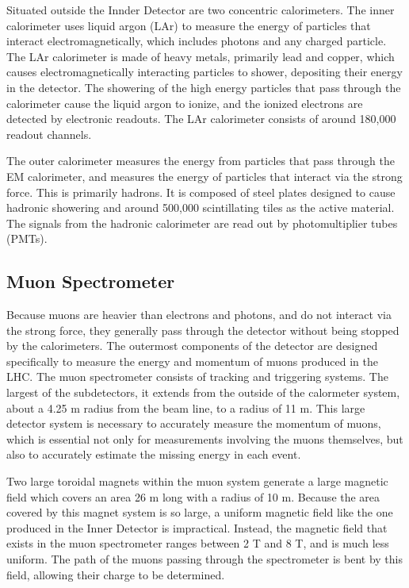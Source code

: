 Situated outside the Innder Detector are two concentric calorimeters. The inner calorimeter uses liquid argon (LAr) to measure the  energy of particles that interact electromagnetically, which includes photons and any charged particle. The LAr calorimeter is made of heavy metals, primarily lead and copper, which causes electromagnetically interacting particles to shower, depositing their energy in the detector. The showering of the high energy particles that pass through the calorimeter cause the liquid argon to ionize, and the ionized electrons are detected by electronic readouts. The LAr calorimeter consists of around 180,000 readout channels.  

The outer calorimeter measures the energy from particles that pass through the EM calorimeter, and measures the energy of particles that interact via the strong force. This is primarily hadrons. It is composed of steel plates designed to cause hadronic showering and around 500,000 scintillating tiles as the active material. The signals from the hadronic calorimeter are read out by photomultiplier tubes (PMTs).

\subsection{Muon Spectrometer}
\label{sec:muonSpec}

Because muons are heavier than electrons and photons, and do not interact via the strong force, they generally pass through the detector without being stopped by the calorimeters. The outermost components of the detector are designed specifically to measure the energy and momentum of muons produced in the LHC. The muon spectrometer consists of tracking and triggering systems. The largest of the subdetectors, it extends from the outside of the calormeter system, about a 4.25 m radius from the beam line, to a radius of 11 m. This large detector system is necessary to accurately measure the momentum of muons, which is essential not only for measurements involving the muons themselves, but also to accurately estimate the missing energy in each event.

Two large toroidal magnets within the muon system generate a large magnetic field which covers an area 26 m long with a radius of 10 m. Because the area covered by this magnet system is so large, a uniform magnetic field like the one produced in the Inner Detector is impractical. Instead, the magnetic field that exists in the muon spectrometer ranges between 2 T and 8 T, and is much less uniform. The path of the muons passing through the spectrometer is bent by this field, allowing their charge to be determined. 

